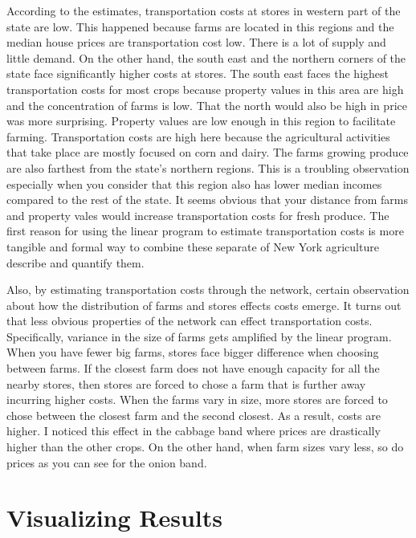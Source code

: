 \documentclass{report}
\begin{document}
According to the estimates, transportation costs at stores in western part of the state are low. This happened because farms are located in this regions and the median house prices are transportation cost low. There is a lot of supply and little demand.  On the other hand, the south east and the northern corners of the state face significantly higher costs at stores. The south east faces the highest transportation costs for most crops because property values in this area are high and the concentration of farms is low. That the north would also be high in price was more surprising. Property values are low enough in this region to facilitate farming. Transportation costs are high here because the agricultural activities that take place are mostly focused on corn and dairy. The farms growing produce are also farthest from the state's northern regions. This is a troubling observation especially when you consider that this region also has lower median incomes compared to the rest of the state. It seems obvious that your distance from farms and property vales would increase transportation costs for fresh produce. The first reason for using the linear program to estimate transportation costs is more tangible and formal way to combine these separate of New York agriculture describe and quantify them.

Also, by estimating transportation costs through the network, certain observation about how the distribution of farms and stores effects costs emerge. It turns out that less obvious properties of the network can effect transportation costs. Specifically, variance in the size of farms gets amplified by the linear program. When you have fewer big farms, stores face bigger difference when choosing between farms. If the closest farm does not have enough capacity for all the nearby stores, then stores are forced to chose a farm that is further away incurring higher costs. When the farms vary in size, more stores are forced to chose between the closest farm and the second closest. As a result, costs are higher. I noticed this effect in the cabbage band where prices are drastically higher than the other crops. On the other hand, when farm sizes vary less, so do prices as you can see for the onion band.

\section{Visualizing Results}
\end{document}
